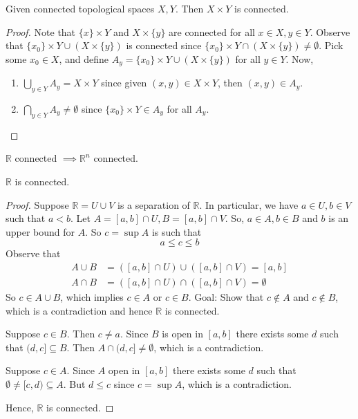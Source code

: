 \begin{theorem}
   Given connected topological spaces \( X, Y \).
   Then \( X \times Y \) is connected.
\end{theorem}

\begin{proof}
  Note that \( \{ x \} \times Y \) and \( X \times \{ y \}  \)
  are connected for all \( x \in X, y \in Y \).
  Observe that \( \{ x_0 \} \times Y  \cup ( X \times \{ y \} ) \)
  is connected since \( \{ x_0 \} \times Y  \cap ( X \times \{ y \} ) \neq \emptyset \).
  Pick some \( x_0 \in X \), and define \( A_y = \{ x_0 \} \times Y  \cup ( X \times \{ y \} ) \) for all \( y \in Y \). Now,
  \begin{enumerate}
    \item \( \bigcup_{y \in Y} A_y = X \times Y \) since
      given \( (x, y) \in X \times Y \), then \( (x, y) \in A_y \).
    \item \( \bigcap_{y \in Y} A_y \neq \emptyset \) since
    \( \{ x_0 \} \times Y \in A_y \) for all \( A_y \).
  \end{enumerate}
\end{proof}

\begin{example}
   \( \mathbb{R} \) connected \( \implies \mathbb{R}^n \) connected. 
\end{example}

\begin{theorem}
    \( \mathbb{R}  \) is connected.
\end{theorem}

\begin{proof}
    Suppose \( \mathbb{R} = U \cup V \)
    is a separation of \( \mathbb{R} \).
    In particular, we have \( a \in U, b \in V \)
    such that \( a < b \).
    Let \( A = [a, b] \cap U, B = [a, b] \cap V \).
    So, \( a \in A, b \in B \)
    and \( b \) is an upper bound for \( A \).
    So \( c = \sup A \) is such that
    \[
      a \le c \le b
    \]
    Observe that
    \begin{align*}
      A \cup B &= ([a, b] \cap U) \cup ([a, b] \cap V) = [a, b] \\
      A \cap B &= ([a, b] \cap U) \cap ([a, b] \cap V) = \emptyset
    \end{align*}
    So \( c \in A \cup B \), which implies \( c \in A \) or \( c \in B \).
    Goal: Show that \( c \not\in A \) and \( c \not\in B \),
    which is a contradiction and hence \( \mathbb{R} \) is connected.

    Suppose \( c \in B \). Then \( c \neq a \).
    Since \( B \) is open in \( [a, b] \) there exists
    some \( d \) such that \( (d, c] \subseteq B \).
    Then \( A \cap (d, c] \neq \emptyset \), which is a contradiction.

    Suppose \( c \in A \). Since \( A \) open in \( [a, b] \)
    there exists some \( d \) such that \( \emptyset \neq [c, d) \subseteq A \).
    But \( d \le c \) since \( c = \sup A \), which is a contradiction.

    Hence, \( \mathbb{R} \) is connected.
\end{proof}


